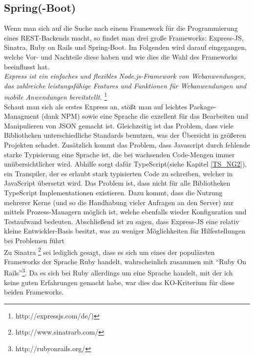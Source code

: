 \subsection{Spring(-Boot)}

Wenn man sich auf die Suche nach einem Framework für die Programmierung eines REST-Backends macht, so findet man drei große Frameworks: Express-JS, Sinatra, Ruby on Rails und Spring-Boot. Im Folgenden wird darauf eingegangen, welche Vor- und Nachteile diese haben und wie dies die Wahl des Frameworks beeinflusst hat. \\

\emph{\glqq   
Express ist ein einfaches und flexibles Node.js-Framework von Webanwendungen, das zahlreiche leistungsfähige Features und Funktionen für Webanwendungen und mobile Anwendungen bereitstellt.
\grqq} \footnote{http://expressjs.com/de/)} \\

Schaut man sich als erstes Express an, stößt man auf leichtes Package-Managment (dank NPM) sowie eine Sprache die exzellent für das Bearbeiten und Manipulieren von JSON gemacht ist. Gleichzeitig ist das Problem, dass viele Bibliotheken unterschiedliche Standards benutzen, was der Übersicht in größeren Projekten schadet. Zusätzlich kommt das Problem, dass Javascript durch fehlende starke Typisierung eine Sprache ist, die bei wachsenden Code-Mengen immer unübersichtlicher wird.
Abhilfe sorgt dafür TypeScript(siehe Kapitel \ref{TS_NG2}), ein Transpiler, der es erlaubt stark typisierten Code zu schreiben, welcher in JavaScript übersetzt wird. Das Problem ist, dass nicht für alle Bibliotheken TypeScript Implementationen existieren. Dazu kommt, dass die Nutzung mehrerer Kerne (und so die Handhabung vieler Anfragen an den Server) nur mittels Prozess-Managern möglich ist, welche ebenfalls wieder Konfiguration und Testaufwand bedeuten. Abschließend ist zu sagen, dass Express-JS eine relativ kleine Entwickler-Basis besitzt, was zu weniger Möglichkeiten für Hilfestellungen bei Problemen führt \\

Zu Sinatra \footnote{http://www.sinatrarb.com/} sei lediglich gesagt, dass es sich um eines der populärsten Frameworks der Sprache Ruby handelt, wahrscheinlich zusammen mit ``Ruby On Rails''\footnote{http://rubyonrails.org/}. Da es sich bei Ruby allerdings um eine Sprache handelt, mit der ich keine guten Erfahrungen gemacht habe, war dies das KO-Kriterium für diese beiden Frameworks. \\

